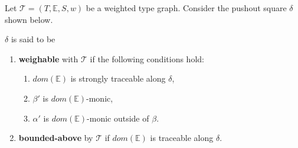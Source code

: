 \begin{definition}
    \label{def:weighable}
        Let  $\mathcal{T} \mathop{=} (T,\mathbb{E}, S, w)$ be a weighted type graph.
        Consider the pushout square $\delta$ shown below.
        \begin{center}
        \end{center}
       $\delta$ is said to be
         \begin{enumerate}[label=(\alph*)]
        \item \textbf{weighable} with $\mathcal{T}$ if the following conditions hold:
            \begin{enumerate}[label=(\roman*)]
                \item $dom(\mathbb{E})$ is strongly traceable along $\delta$,
                \item $\beta'$ is $dom(\mathbb{E})$-monic,
                \item $\alpha'$ is $dom(\mathbb{E})$-monic outside of $\beta$.
            \end{enumerate}
        \item \textbf{bounded-above} by $\mathcal{T}$ if $dom(\mathbb{E})$ is traceable along $\delta$.
    \end{enumerate}
   
\end{definition}


